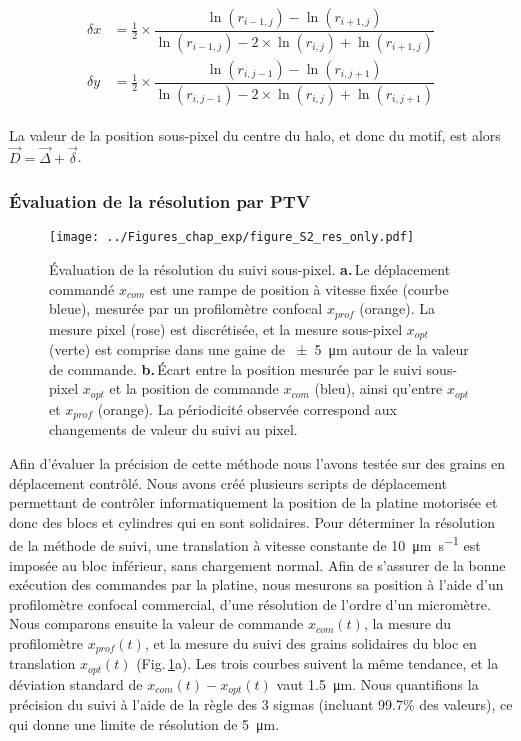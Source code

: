 \begin{align}[left=\empheqlbrace]
\begin{split}
\delta x &=\frac{1}{2}\times \dfrac{\ln(r_{i-1,j})-\ln(r_{i+1,j})}{\ln(r_{i-1,j})-2\times\ln(r_{i,j})+\ln(r_{i+1,j})}\\
\delta y &=\frac{1}{2}\times \dfrac{\ln(r_{i,j-1})-\ln(r_{i,j+1})}{\ln(r_{i,j-1})-2\times\ln(r_{i,j})+\ln(r_{i,j+1})}
\end{split}
\end{align}

La valeur de la position sous-pixel du centre du halo, et donc du motif, est alors $\vec{D} = \vec{\Delta}+\vec{\delta}$.

\subsubsection{Évaluation de la résolution par PTV}



\begin{figure}[hbt]
\centering
\texttt{[image: ../Figures\_chap\_exp/figure\_S2\_res\_only.pdf]}
\caption[Évaluation de la résolution de la PTV]{Évaluation de la résolution du suivi sous-pixel. \textbf{a.}\,Le déplacement commandé $x_{com}$ est une rampe de position à vitesse fixée (courbe bleue), mesurée par un profilomètre confocal $x_{prof}$ (orange). La mesure pixel (rose) est discrétisée, et la mesure  sous-pixel $x_{opt}$ (verte) est comprise dans une gaine de \SI{+-5}{\micro\meter} autour de la valeur de commande. \textbf{b.}\,Écart entre la position mesurée par le suivi sous-pixel $x_{opt}$ et la position de commande $x_{com}$ (bleu), ainsi qu'entre $x_{opt}$ et $x_{prof}$ (orange). La périodicité observée correspond aux changements de valeur du suivi au pixel.}
\label{fig:trackingres2}
\end{figure}


Afin d'évaluer la précision de cette méthode nous l'avons testée sur des grains en déplacement contrôlé. Nous avons créé plusieurs scripts de déplacement permettant de contrôler
informatiquement
la position de la platine motorisée et donc des blocs et cylindres qui en sont solidaires. Pour déterminer la résolution de la méthode de suivi, une translation à vitesse constante de \SI{10}{\micro\meter\per\second} est imposée au bloc inférieur, sans chargement normal. Afin de s'assurer de la bonne exécution des commandes par la platine, nous mesurons sa position à l'aide d'un profilomètre confocal commercial, d'une résolution de l'ordre d'un micromètre. Nous comparons ensuite la valeur de commande $x_{com}(t)$, la mesure du profilomètre $x_{prof}(t)$, et la mesure du suivi des grains solidaires du bloc en translation $x_{opt}(t)$ (Fig.\,\ref{fig:trackingres2}a). Les trois courbes suivent la même tendance, et la déviation standard de $x_{com}(t)-x_{opt}(t)$ vaut \SI{1.5}{\micro\meter}. Nous quantifions la précision du suivi à l'aide de la règle des 3 sigmas (incluant 99.7\% des valeurs), ce qui donne une limite de résolution de \SI{5}{\micro\meter}.


